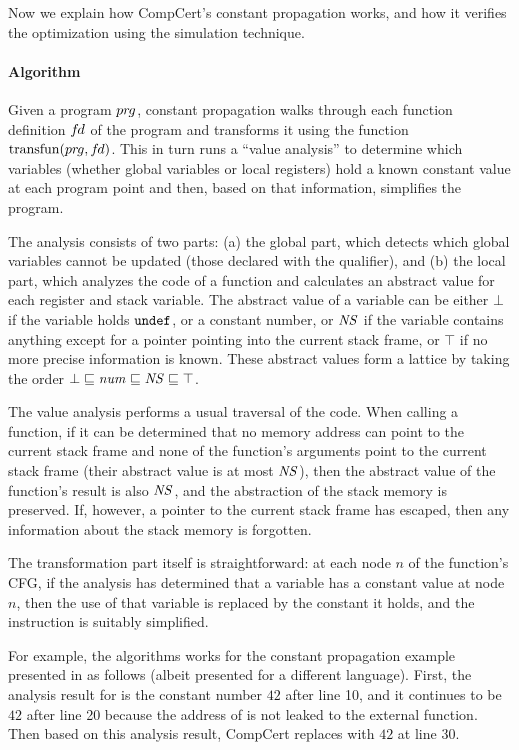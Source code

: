 Now we explain how CompCert's constant propagation works, and how it verifies the optimization using
the simulation technique.

\paragraph{Algorithm}

Given a program ${pr\hspace*{-1pt}g}$, constant propagation walks through each function definition ${f\hspace*{-1pt}d}$ of the program 
and transforms it using the function $\mathrm{transfun}({pr\hspace*{-1pt}g}, {f\hspace*{-1pt}d})$.
This in turn runs a ``value analysis'' to determine which variables (whether global variables or local registers) hold a known constant value at each program point
and then, based on that information, simplifies the program.

The analysis consists of two parts: 
(a) the global part, which detects which global variables cannot be updated (\ie those declared with the  qualifier), and
(b) the local part, which analyzes the code of a function and calculates an abstract value for each register and stack variable.
The abstract value of a variable can be either $\bot$ if the variable holds $\mathtt{undef}$, 
or a constant number, 
or $\mathit{NS}$ if the variable contains anything except for a pointer pointing into the current stack frame, 
or $\top$ if no more precise information is known.
These abstract values form a lattice by taking the order $\bot \sqsubseteq \mathit{num} \sqsubseteq \mathit{NS} \sqsubseteq \top$.


The value analysis performs a usual traversal of the code. 
When calling a function, 
if it can be determined that no memory address can point to the current stack frame 
and none of the function's arguments point to the current stack frame (\ie their abstract value is at most $\mathit{NS}$), 
then the abstract value of the function's result is also $\mathit{NS}$, and the abstraction of the stack memory is preserved.
If, however, a pointer to the current stack frame has escaped, then any information about the stack memory is forgotten.

The transformation part itself is straightforward: 
at each node $n$ of the function's CFG, if the analysis has determined that a variable has a constant value at node $n$,
then the use of that variable is replaced by the constant it holds, and the instruction is suitably simplified.

For example, the algorithms works for the constant propagation example presented in
 as follows (albeit presented for a different language).  First, the analysis
result for  is the constant number $42$ after line 10, and it continues to be $42$ after
line 20 because the address of  is not leaked to the external function.  Then based on this
analysis result, CompCert replaces  with $42$ at line 30.

